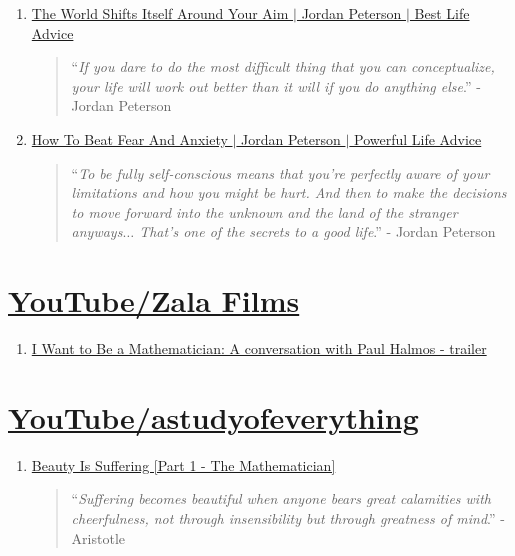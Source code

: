 \documentclass{book}
\numberwithin{equation}{section}
\begin{document}
\begin{enumerate}
\begin{quotation}
    \end{quotation}
    \item \href{https://www.youtube.com/watch?v=zRYjVFFsi38}{The World Shifts Itself Around Your Aim $|$ Jordan Peterson $|$ Best Life Advice}    
    \begin{quotation}
        ``\textit{If you dare to do the most difficult thing that you can conceptualize, your life will work out better than it will if you do anything else}.'' - Jordan Peterson
    \end{quotation}
    \item \href{https://www.youtube.com/watch?v=bb9g9mtDHZo}{How To Beat Fear And Anxiety $|$ Jordan Peterson $|$ Powerful Life Advice}    
    \begin{quotation}
        ``\textit{To be fully self-conscious means that you're perfectly aware of your limitations and how you might be hurt. And then to make the decisions to move forward into the unknown and the land of the stranger anyways$\ldots$ That's one of the secrets to a good life}.'' - Jordan Peterson
    \end{quotation}
\end{enumerate}


\chapter{\href{https://www.youtube.com/channel/UCrBsO0_kjefBUQPNgaELGGw}{YouTube/Zala Films}}

\begin{enumerate}
    \item \href{https://www.youtube.com/watch?v=ONvYPldXoZs}{I Want to Be a Mathematician: A conversation with Paul Halmos - trailer}
\end{enumerate}


\chapter{\href{https://www.youtube.com/channel/UCDok3oTo2SSWZt6I8sHuzVg}{YouTube/astudyofeverything}}

\begin{enumerate}
    \item \href{https://www.youtube.com/watch?v=i0UTeQfnzfM}{Beauty Is Suffering [Part 1 - The Mathematician]}
    \begin{quotation}
        ``\textit{Suffering becomes beautiful when anyone bears great calamities with cheerfulness, not through insensibility but through greatness of mind}.'' - Aristotle
    \end{quotation}
\end{enumerate}
\end{document}
